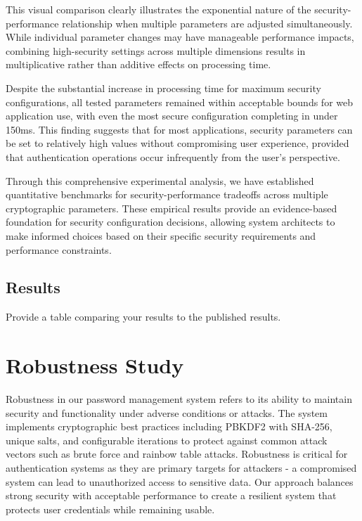 \documentclass[11pt,a4paper]{article}
\begin{document}
This visual comparison clearly illustrates the exponential nature of the security-performance relationship when multiple parameters are adjusted simultaneously. While individual parameter changes may have manageable performance impacts, combining high-security settings across multiple dimensions results in multiplicative rather than additive effects on processing time.

Despite the substantial increase in processing time for maximum security configurations, all tested parameters remained within acceptable bounds for web application use, with even the most secure configuration completing in under 150ms. This finding suggests that for most applications, security parameters can be set to relatively high values without compromising user experience, provided that authentication operations occur infrequently from the user's perspective.

Through this comprehensive experimental analysis, we have established quantitative benchmarks for security-performance tradeoffs across multiple cryptographic parameters. These empirical results provide an evidence-based foundation for security configuration decisions, allowing system architects to make informed choices based on their specific security requirements and performance constraints.


\subsection{Results}
Provide a table comparing your results to the published results.

\section{Robustness Study}

Robustness in our password management system refers to its ability to maintain security and functionality under adverse conditions or attacks. The system implements cryptographic best practices including PBKDF2 with SHA-256, unique salts, and configurable iterations to protect against common attack vectors such as brute force and rainbow table attacks. Robustness is critical for authentication systems as they are primary targets for attackers - a compromised system can lead to unauthorized access to sensitive data. Our approach balances strong security with acceptable performance to create a resilient system that protects user credentials while remaining usable.
\end{document}
